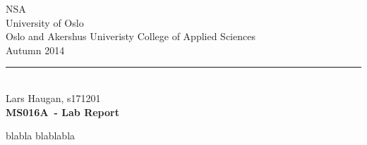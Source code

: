 \documentclass[11pt,english,a4paper] {report}
\author{Lars Haugan - s171201}
\def\course{MS016A}
\def\reportname{Lab Report}
\def\name{Lars Haugan}
\def\studentnr{s171201}
\def\line{NSA}
\def\school{University of Oslo \\ Oslo and Akershus Univeristy College of Applied Sciences}
\def\semester{Autumn 2014}
\newcommand{\HRule}{\rule{\linewidth}{0.2mm}}
\begin{document}
\begin{titlepage}
    \begin{center}

        \large \line\\
        \large \school\\ \semester\\[0.4cm]
        \HRule\\[1.5cm]
        \name, \studentnr
        \ \\[6.0cm]
        \LARGE\textbf{\course\ - \reportname}

    \end{center}
\end{titlepage}



\allsectionsfont{\sffamily}

\tableofcontents



blabla \cite{Vickrey1961}
blablabla


\end{document}
